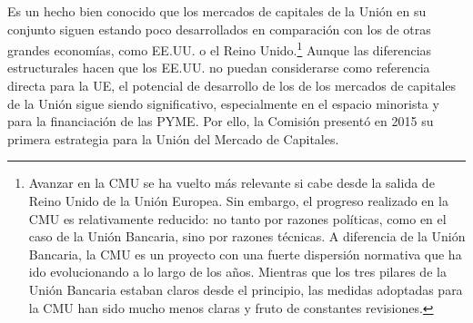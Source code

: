 \documentclass[10pt,a4paper]{article}
\begin{document}
{Es un hecho bien conocido que los mercados de capitales de la Unión en su conjunto siguen estando poco desarrollados en comparación con los de otras grandes economías, como EE.UU. o el Reino Unido.\footnote{%
    Avanzar en la CMU se ha vuelto más relevante si cabe desde la salida de Reino Unido de la Unión Europea. Sin embargo, el progreso realizado en la CMU es relativamente reducido: no tanto por razones políticas, como en el caso de la Unión Bancaria, sino por razones técnicas. A diferencia de la Unión Bancaria, la CMU es un proyecto con una fuerte dispersión normativa que ha ido evolucionando a lo largo de los años. Mientras que los tres pilares de la Unión Bancaria estaban claros desde el principio, las medidas adoptadas para la CMU han sido mucho menos claras y fruto de constantes revisiones.
} Aunque las diferencias estructurales hacen que los EE.UU. no puedan considerarse como referencia directa para la UE, el potencial de desarrollo de los de los mercados de capitales de la Unión sigue siendo significativo, especialmente en el espacio minorista y para la financiación de las PYME. Por ello, la Comisión presentó en 2015 su primera estrategia para la Unión del Mercado de Capitales.

}
\end{document}
